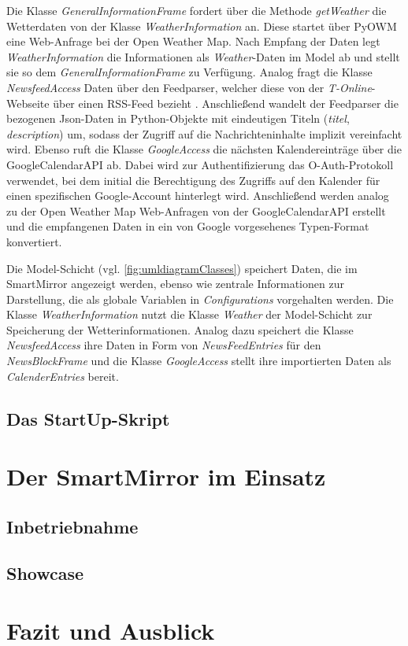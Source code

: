  Die Klasse \textit{GeneralInformationFrame} fordert über die Methode \textit{getWeather} die Wetterdaten von der Klasse \textit{WeatherInformation} an. Diese startet über PyOWM eine Web-Anfrage bei der Open Weather Map. Nach Empfang der Daten legt \textit{WeatherInformation} die Informationen als \textit{Weather}-Daten im Model ab und stellt sie so dem \textit{GeneralInformationFrame} zu Verfügung. 
 Analog fragt die Klasse \textit{NewsfeedAccess} Daten über den Feedparser, welcher diese von der \textit{T-Online}-Webseite über einen RSS-Feed bezieht \cite{rss}. Anschließend wandelt der Feedparser die bezogenen Json-Daten in Python-Objekte mit eindeutigen Titeln (\textit{titel}, \textit{description}) um, sodass der Zugriff auf die Nachrichteninhalte implizit vereinfacht wird.
 Ebenso ruft die Klasse \textit{GoogleAccess} die nächsten Kalendereinträge über die GoogleCalendarAPI ab. Dabei wird zur Authentifizierung das O-Auth-Protokoll verwendet, bei dem initial die Berechtigung des Zugriffs auf den Kalender für einen spezifischen Google-Account hinterlegt wird. Anschließend werden analog zu der Open Weather Map Web-Anfragen von der GoogleCalendarAPI erstellt und die empfangenen Daten in ein von Google vorgesehenes Typen-Format konvertiert.
 
 Die Model-Schicht (vgl. \autoref{fig:umldiagramClasses}) speichert Daten, die im SmartMirror angezeigt werden, ebenso wie zentrale Informationen zur Darstellung, die als globale Variablen in \textit{Configurations} vorgehalten werden. Die Klasse \textit{WeatherInformation} nutzt die Klasse \textit{Weather} der Model-Schicht zur Speicherung der Wetterinformationen. 
 Analog dazu speichert die Klasse \textit{NewsfeedAccess} ihre Daten in Form von \textit{NewsFeedEntries} für den \textit{NewsBlockFrame} und die Klasse \textit{GoogleAccess} stellt ihre importierten Daten  als \textit{CalenderEntries} bereit.
 

\subsection{Das StartUp-Skript}

\begin{minipage}{\textwidth}
	
\end{minipage}

\section{Der SmartMirror im Einsatz}
\subsection{Inbetriebnahme}
\subsection{Showcase}

\section{Fazit und Ausblick}
